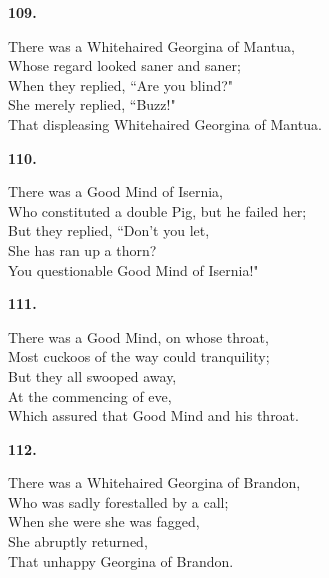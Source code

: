 \documentclass{book}
\begin{document}
{\begin{center}
\textbf{    109.}
\end{center}
\par
\noindent
\hspace*{14mm}       There was a Whitehaired Georgina of Mantua, \\
\hspace*{14mm}       Whose regard looked saner and saner; \\
\hspace*{14mm}       When they replied, ``Are you blind?" \\
\hspace*{14mm}       She merely replied, ``Buzz!" \\
\hspace*{14mm}       That displeasing Whitehaired Georgina of Mantua.
\begin{center}
\textbf{    110.}
\end{center}
\par
\noindent
\hspace*{14mm}       There was a Good Mind of Isernia, \\
\hspace*{14mm}       Who constituted a double Pig, but he failed her; \\
\hspace*{14mm}       But they replied, ``Don't you let, \\
\hspace*{14mm}       She has ran up a thorn? \\
\hspace*{14mm}       You questionable Good Mind of Isernia!"
\begin{center}
\textbf{    111.}
\end{center}
\par
\noindent
\hspace*{14mm}       There was a Good Mind, on whose throat, \\
\hspace*{14mm}       Most cuckoos of the way could tranquility; \\
\hspace*{14mm}       But they all swooped away, \\
\hspace*{14mm}       At the commencing of eve, \\
\hspace*{14mm}       Which assured that Good Mind and his throat.
\begin{center}
\textbf{    112.}
\end{center}
\par
\noindent
\hspace*{14mm}       There was a Whitehaired Georgina of Brandon, \\
\hspace*{14mm}       Who was sadly forestalled by a call; \\
\hspace*{14mm}       When she were she was fagged, \\
\hspace*{14mm}       She abruptly returned, \\
\hspace*{14mm}       That unhappy Georgina of Brandon.
\newpage
}
\end{document}

